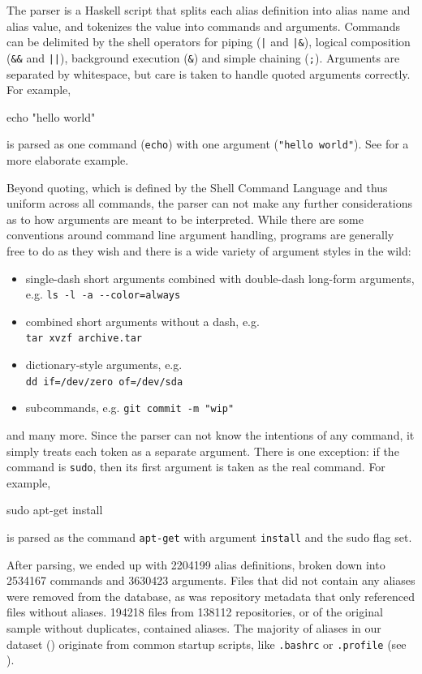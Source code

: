 The parser is a Haskell script that splits each alias definition into alias name and alias value, and tokenizes the value into commands and arguments.
Commands can be delimited by the shell operators for piping (\verb!|! and \verb!|&!), logical composition (\verb|&&| and \verb!||!), background execution (\verb|&|) and simple chaining (\verb|;|).
Arguments are separated by whitespace, but care is taken to handle quoted arguments correctly. 
For example, 
\begin{CVerbatim}
echo "hello world"
\end{CVerbatim}
is parsed as one command (\texttt{echo}) with one argument (\texttt{"hello world"}).
See  for a more elaborate example.

Beyond quoting, which is defined by the Shell Command Language and thus uniform across all commands, the parser can not make any further considerations as to how arguments are meant to be interpreted.
While there are some conventions around command line argument handling, programs are generally free to do as they wish and there is a wide variety of argument styles in the wild:
\begin{itemize}
    \item single-dash short arguments combined with double-dash long-form arguments, e.g. \verb|ls -l -a --color=always|
    \item combined short arguments without a dash, e.g. \\ \verb|tar xvzf archive.tar|
    \item dictionary-style arguments, e.g. \\ \verb|dd if=/dev/zero of=/dev/sda|
    \item subcommands, e.g. \verb|git commit -m "wip"|
\end{itemize}
and many more.
Since the parser can not know the intentions of any command, it simply treats each token as a separate argument.
There is one exception: if the command is \texttt{sudo}, then its first argument is taken as the real command. 
For example,
\begin{CVerbatim}
sudo apt-get install
\end{CVerbatim} 
is parsed as the command \texttt{apt-get} with argument \texttt{install} and the sudo flag set.

After parsing, we ended up with \num{2204199} alias definitions, broken down into \num{2534167} commands and \num{3630423} arguments.
Files that did not contain any aliases were removed from the database, as was repository metadata that only referenced files without aliases.
\num{194218} files from \num{138112} repositories, or  of the original sample without duplicates, contained aliases.
The majority of aliases in our dataset () originate from common startup scripts, like \texttt{.bashrc} or \texttt{.profile} (see ).

